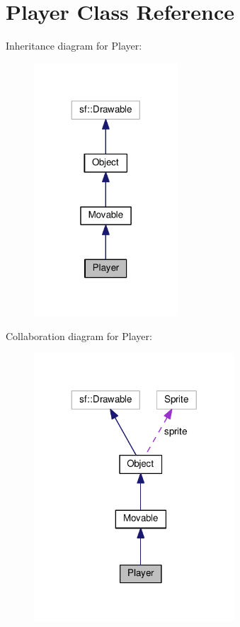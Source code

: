 \hypertarget{classPlayer}{\section{Player Class Reference}
\label{classPlayer}
}


Inheritance diagram for Player\+:
\nopagebreak
\begin{figure}[H]
\begin{center}
\leavevmode
\includegraphics[width=152pt]{classPlayer__inherit__graph}
\end{center}
\end{figure}


Collaboration diagram for Player\+:
\nopagebreak
\begin{figure}[H]
\begin{center}
\leavevmode
\includegraphics[width=212pt]{classPlayer__coll__graph}
\end{center}
\end{figure}
